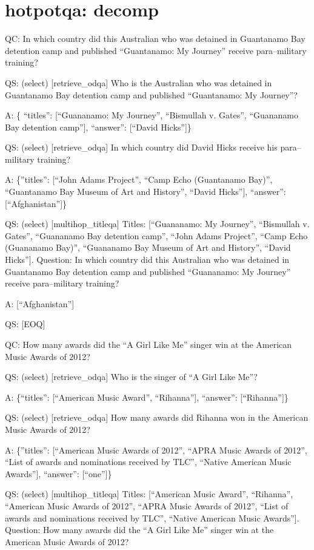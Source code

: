 \documentclass[
]{article}
\begin{document}
\section{hotpotqa: decomp}\label{hotpotqa-decomp}

QC: In which country did this Australian who was detained in Guantanamo
Bay detention camp and published ``Guantanamo: My Journey'' receive
para--military training?

QS: (select) {[}retrieve\_odqa{]} Who is the Australian who was detained
in Guantanamo Bay detention camp and published ``Guantanamo: My
Journey''?

A: \{ ``titles'': {[}``Guananamo: My Journey'', ``Bismullah v. Gates'',
``Guananamo Bay detention camp''{]}, ``answer'': {[}``David Hicks''{]}\}

QS: (select) {[}retrieve\_odqa{]} In which country did David Hicks
receive his para--military training?

A: \{''titles'': {[}``John Adams Project'', ``Camp Echo (Guantanamo
Bay)'', ``Guantanamo Bay Museum of Art and History'', ``David
Hicks''{]}, ``answer'': {[}``Afghanistan''{]}\}

QS: (select) {[}multihop\_titleqa{]} Titles: {[}``Guananamo: My
Journey'', ``Bismullah v. Gates'', ``Guananamo Bay detention camp'',
``John Adams Project'', ``Camp Echo (Guananamo Bay)'', ``Guananamo Bay
Museum of Art and History'', ``David Hicks''{]}. Question: In which
country did this Australian who was detained in Guantanamo Bay detention
camp and published ``Guananamo: My Journey'' receive para--military
training?

A: {[}``Afghanistan''{]}

QS: {[}EOQ{]}

QC: How many awards did the ``A Girl Like Me'' singer win at the
American Music Awards of 2012?

QS: (select) {[}retrieve\_odqa{]} Who is the singer of ``A Girl Like
Me''?

A: \{``titles'': {[}``American Music Award'', ``Rihanna''{]},
``answer'': {[}``Rihanna''{]}\}

QS: (select) {[}retrieve\_odqa{]} How many awards did Rihanna won in the
American Music Awards of 2012?

A: \{''titles'': {[}``American Music Awards of 2012'', ``APRA Music
Awards of 2012'', ``List of awards and nominations received by TLC'',
``Native American Music Awards''{]}, ``answer'': {[}``one''{]}\}

QS: (select) {[}multihop\_titleqa{]} Titles: {[}``American Music
Award'', ``Rihanna'', ``American Music Awards of 2012'', ``APRA Music
Awards of 2012'', ``List of awards and nominations received by TLC'',
``Native American Music Awards''{]}. Question: How many awards did the
``A Girl Like Me'' singer win at the American Music Awards of 2012?
\end{document}
